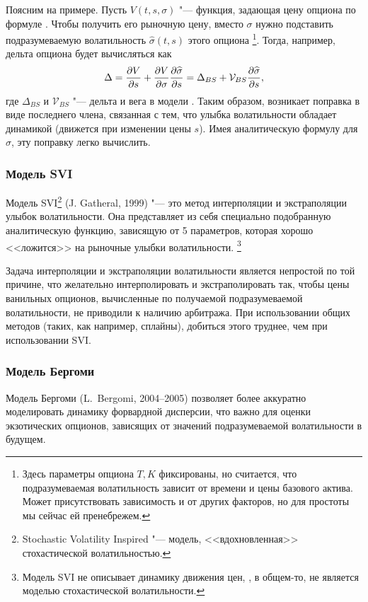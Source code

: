 Поясним на примере.
Пусть $V(t,s,\sigma)$ "--- функция, задающая цену опциона по формуле \bs.
Чтобы получить его рыночную цену, вместо $\sigma$ нужно подставить подразумеваемую волатильность $\hat\sigma(t,s)$ этого опциона%
\footnote{Здесь параметры опциона $T,K$ фиксированы, но считается, что подразумеваемая волатильность зависит от времени и цены базового актива.
Может присутствовать зависимость и от других факторов, но для простоты мы сейчас ей пренебрежем.}.
Тогда, например, дельта опциона будет вычисляться как
\[
\Delta = \frac{\partial V}{\partial s} + \frac{\partial V}{\partial \sigma} \frac{\partial \widehat\sigma}{\partial s} = \Delta_{BS} + \mathcal{V}_{BS} \frac{\partial \widehat\sigma}{\partial s},
\]
где $\Delta_{BS}$ и $\mathcal{V}_{BS}$ "--- дельта и вега в модели \bs.
Таким образом, возникает поправка в виде последнего члена, связанная с тем, что улыбка волатильности обладает динамикой (движется при изменении цены $s$).
Имея аналитическую формулу для $\hat\sigma$, эту поправку легко вычислить. 


\subsubsection{Модель SVI}

Модель SVI\footnote{Stochastic Volatility Inspired "--- модель, <<вдохновленная>> стохастической волатильностью.} (J. Gatheral, 1999) "--- это метод интерполяции и экстраполяции улыбок волатильности.
Она представляет из себя специально подобранную аналитическую функцию, зависящую от 5 параметров, которая хорошо <<ложится>> на рыночные улыбки волатильности.%
\footnote{Модель SVI не описывает динамику движения цен, \te, в общем-то, не является моделью стохастической волатильности.}

Задача интерполяции и экстраполяции волатильности является непростой по той причине, что желательно интерполировать и экстраполировать так, чтобы цены ванильных опционов, вычисленные по получаемой подразумеваемой волатильности, не приводили к наличию арбитража. 
При использовании общих методов (таких, как например, сплайны), добиться этого труднее, чем при использовании SVI.


\subsubsection{Модель Бергоми}

Модель Бергоми (L.~Bergomi, 2004--2005) позволяет более аккуратно моделировать динамику форвардной дисперсии, что важно для оценки экзотических опционов, зависящих от значений подразумеваемой волатильности в будущем.

